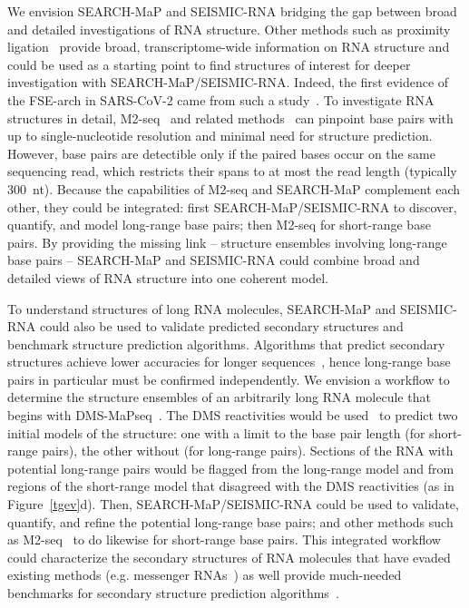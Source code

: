 \documentclass[main.tex]{subfiles}
\begin{document}
We envision SEARCH-MaP and SEISMIC-RNA bridging the gap between broad and detailed investigations of RNA structure.
Other methods such as proximity ligation~\cite{Aw2016,Lu2016,Sharma2016,Ziv2018,vanDamme2022} provide broad, transcriptome-wide information on RNA structure and could be used as a starting point to find structures of interest for deeper investigation with SEARCH-MaP/SEISMIC-RNA.
Indeed, the first evidence of the FSE-arch in SARS-CoV-2 came from such a study~\cite{Ziv2020}.
To investigate RNA structures in detail, M2-seq~\cite{Cheng2017} and related methods~\cite{Cordero2015} can pinpoint base pairs with up to single-nucleotide resolution and minimal need for structure prediction.
However, base pairs are detectible only if the paired bases occur on the same sequencing read, which restricts their spans to at most the read length (typically 300~nt).
Because the capabilities of M2-seq and SEARCH-MaP complement each other, they could be integrated: first SEARCH-MaP/SEISMIC-RNA to discover, quantify, and model long-range base pairs; then M2-seq for short-range base pairs.
By providing the missing link -- structure ensembles involving long-range base pairs -- SEARCH-MaP and SEISMIC-RNA could combine broad and detailed views of RNA structure into one coherent model.

To understand structures of long RNA molecules, SEARCH-MaP and SEISMIC-RNA could also be used to validate predicted secondary structures and benchmark structure prediction algorithms.
Algorithms that predict secondary structures achieve lower accuracies for longer sequences~\cite{Doshi2004,Nicholson2015}, hence long-range base pairs in particular must be confirmed independently.
We envision a workflow to determine the structure ensembles of an arbitrarily long RNA molecule that begins with DMS-MaPseq~\cite{Zubradt2016}.
The DMS reactivities would be used~\cite{Cordero2012} to predict two initial models of the structure: one with a limit to the base pair length (for short-range pairs), the other without (for long-range pairs).
Sections of the RNA with potential long-range pairs would be flagged from the long-range model and from regions of the short-range model that disagreed with the DMS reactivities (as in Figure~\ref{tgev}d).
Then, SEARCH-MaP/SEISMIC-RNA could be used to validate, quantify, and refine the potential long-range base pairs; and other methods such as M2-seq~\cite{Cheng2017} to do likewise for short-range base pairs.
This integrated workflow could characterize the secondary structures of RNA molecules that have evaded existing methods (e.g. messenger RNAs~\cite{Lange2012}) as well provide much-needed benchmarks for secondary structure prediction algorithms~\cite{Mathews2019}.
\end{document}
